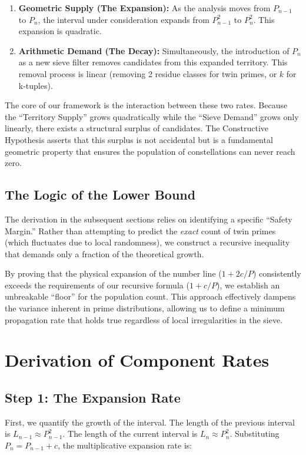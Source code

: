 \documentclass[sn-mathphys-num, pdflatex]{sn-jnl}
\begin{document}
\begin{enumerate}
    \item \textbf{Geometric Supply (The Expansion):} As the analysis moves from $P_{n-1}$ to $P_{n}$, the interval under consideration expands from $P_{n-1}^2$ to $P_{n}^2$. This expansion is quadratic.
    \item \textbf{Arithmetic Demand (The Decay):} Simultaneously, the introduction of $P_{n}$ as a new sieve filter removes candidates from this expanded territory. This removal process is linear (removing 2 residue classes for twin primes, or $k$ for k-tuples).
\end{enumerate}

The core of our framework is the interaction between these two rates. Because the ``Territory Supply'' grows quadratically while the ``Sieve Demand'' grows only linearly, there exists a structural surplus of candidates. The Constructive Hypothesis asserts that this surplus is not accidental but is a fundamental geometric property that ensures the population of constellations can never reach zero.

\subsection{The Logic of the Lower Bound}
The derivation in the subsequent sections relies on identifying a specific ``Safety Margin.'' Rather than attempting to predict the \textit{exact} count of twin primes (which fluctuates due to local randomness), we construct a recursive inequality that demands only a fraction of the theoretical growth.

By proving that the physical expansion of the number line ($1 + 2c/P$) consistently exceeds the requirements of our recursive formula ($1 + c/P$), we establish an unbreakable ``floor'' for the population count. This approach effectively dampens the variance inherent in prime distributions, allowing us to define a minimum propagation rate that holds true regardless of local irregularities in the sieve.
\section{Derivation of Component Rates}

\subsection{Step 1: The Expansion Rate }
First, we quantify the growth of the interval.
The length of the previous interval is $L_{n-1} \approx P_{n-1}^2$.
The length of the current interval is $L_n \approx P_n^2$.
Substituting $P_n = P_{n-1} + c$, the multiplicative expansion rate is:
\end{document}
